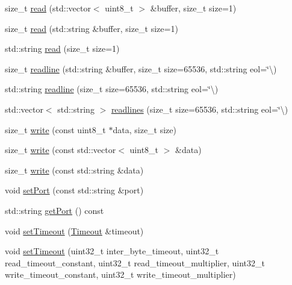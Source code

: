 \begin{DoxyCompactItemize}
\item 
size\+\_\+t \mbox{\hyperlink{classserial_1_1_serial_aa3795c6cbc96f504932dd02fd6e9538e}{read}} (std\+::vector$<$ uint8\+\_\+t $>$ \&buffer, size\+\_\+t size=1)
\item 
size\+\_\+t \mbox{\hyperlink{classserial_1_1_serial_ac47576244e34abc2e460ba99684c351f}{read}} (std\+::string \&buffer, size\+\_\+t size=1)
\item 
std\+::string \mbox{\hyperlink{classserial_1_1_serial_a6c71ad1cbacf86cead4d38b48c548405}{read}} (size\+\_\+t size=1)
\item 
size\+\_\+t \mbox{\hyperlink{classserial_1_1_serial_a24de63dfc928479a457b6caf5f74f6ad}{readline}} (std\+::string \&buffer, size\+\_\+t size=65536, std\+::string eol=\char`\"{}\textbackslash{})
\item 
std\+::string \mbox{\hyperlink{classserial_1_1_serial_a462eb4c564b888142188c2683b062524}{readline}} (size\+\_\+t size=65536, std\+::string eol=\char`\"{}\textbackslash{})
\item 
std\+::vector$<$ std\+::string $>$ \mbox{\hyperlink{classserial_1_1_serial_a2a9a1656cc1a296a5a31a682099e13c1}{readlines}} (size\+\_\+t size=65536, std\+::string eol=\char`\"{}\textbackslash{})
\item 
size\+\_\+t \mbox{\hyperlink{classserial_1_1_serial_aa020880cdff3a370ddc574f594379c3c}{write}} (const uint8\+\_\+t $\ast$data, size\+\_\+t size)
\item 
size\+\_\+t \mbox{\hyperlink{classserial_1_1_serial_a2c4180b4c7d386c84e9d0e7ef4a267d3}{write}} (const std\+::vector$<$ uint8\+\_\+t $>$ \&data)
\item 
size\+\_\+t \mbox{\hyperlink{classserial_1_1_serial_a7c92c0307b86a935f6623953eec66460}{write}} (const std\+::string \&data)
\item 
void \mbox{\hyperlink{classserial_1_1_serial_acecb0a5102ae0c944fe4b78e4adf839a}{set\+Port}} (const std\+::string \&port)
\item 
std\+::string \mbox{\hyperlink{classserial_1_1_serial_a50ceb4a9d3fe2d6e9a21ba83a3222a9b}{get\+Port}} () const
\item 
void \mbox{\hyperlink{classserial_1_1_serial_a4fc63af4b800a9f9e757414f38f3e8b3}{set\+Timeout}} (\mbox{\hyperlink{structserial_1_1_timeout}{Timeout}} \&timeout)
\item 
void \mbox{\hyperlink{classserial_1_1_serial_a4b4be39af3e1c68bc6ac09cb55788c86}{set\+Timeout}} (uint32\+\_\+t inter\+\_\+byte\+\_\+timeout, uint32\+\_\+t read\+\_\+timeout\+\_\+constant, uint32\+\_\+t read\+\_\+timeout\+\_\+multiplier, uint32\+\_\+t write\+\_\+timeout\+\_\+constant, uint32\+\_\+t write\+\_\+timeout\+\_\+multiplier)

\end{DoxyCompactItemize}
